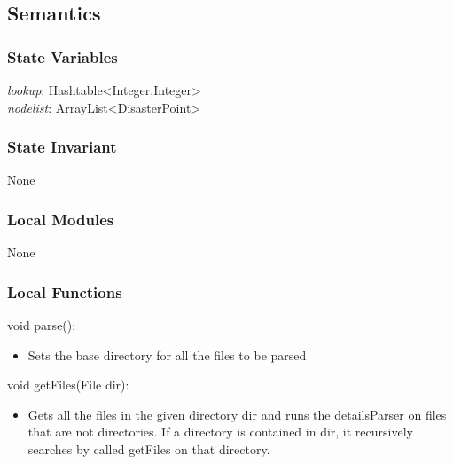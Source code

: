 \documentclass[12pt]{article}
\begin{document}
                \subsection* {Semantics}
                
                \subsubsection *{State Variables} 
                
                    \textit{lookup}: Hashtable<Integer,Integer>\\
                    \textit{nodelist}: ArrayList<DisasterPoint>\\

                \subsubsection *{State Invariant}
                
                None
                
                \subsubsection*{Local Modules}
                
                None
                
                \subsubsection*{Local Functions}
                
                \noindent void parse():
                \begin{itemize}
                    \item Sets the base directory for all the files to be parsed
                \end{itemize}
                
                \noindent void getFiles(File dir):
                \begin{itemize}
                    \item Gets all the files in the given directory dir and runs the detailsParser
	                    on files that are not directories. If a directory is contained in dir, it
	                    recursively searches by called getFiles on that directory.
                \end{itemize}
                
\end{document}
